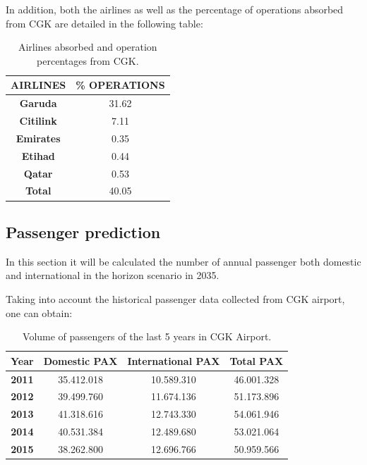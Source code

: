 In addition, both the airlines as well as the percentage of operations absorbed from CGK are detailed in the following table:

	\begin{table}[ht!]
	\label{table:AirlinesAbsorbed}
	\centering
	\begin{tabular}{|c|c|}
		\hline
		\textbf{AIRLINES} & \textbf{\% OPERATIONS}\\
		\hline
		\textbf{Garuda} & 31.62\\
		\hline
		\textbf{Citilink} & 7.11\\
		\hline
		\textbf{Emirates} & 0.35\\
		\hline
		\textbf{Etihad} & 0.44\\
		\hline
		\textbf{Qatar} & 0.53\\
		\hline
		\textbf{Total} & 40.05\\
		\hline
	\end{tabular}
	\caption{Airlines absorbed and operation percentages from CGK.}
	\end{table}

	\subsection{Passenger prediction}
In this section it will be calculated the number of annual passenger both domestic and international in the horizon scenario in 2035.
 
Taking into account the historical passenger data collected from CGK airport, one can obtain:

\begin{table}[ht!]
	\label{table:PAXCGK}
	\centering
\begin{tabular}{|c|c|c|c|}
	\hline 
	\textbf{Year} & \textbf{Domestic PAX} & \textbf{International PAX} & \textbf{Total PAX}\tabularnewline
	\hline 
	\textbf{2011} & 35.412.018  & 10.589.310  & 46.001.328 \tabularnewline
	\hline 
	\textbf{2012} & 39.499.760  & 11.674.136  & 51.173.896 \tabularnewline
	\hline 
	\textbf{2013} & 41.318.616  & 12.743.330  & 54.061.946 \tabularnewline
	\hline 
	\textbf{2014} & 40.531.384  & 12.489.680  & 53.021.064 \tabularnewline
	\hline 
	\textbf{2015} & 38.262.800  & 12.696.766  & 50.959.566 \tabularnewline
	\hline 
\end{tabular}
	\caption{Volume of passengers of the last 5 years in CGK Airport.}
\end{table}

